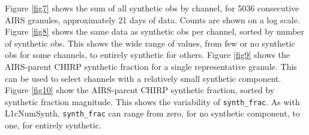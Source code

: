 \documentclass[12pt]{article}
\begin{document}
Figure \ref{fig7} shows the sum of all synthetic obs by channel,
for 5036 consecutive AIRS granules, approximately 21 days of data.
Counts are shown on a log scale.  Figure \ref{fig8} shows the same
data as synthetic obs per channel, sorted by number of synthetic
obs. This shows the wide range of values, from few or no synthetic
obs for some channels, to entirely synthetic for others.  Figure
\ref{fig9} shows the AIRS-parent CHIRP synthetic fraction for a
single representative granule. This can be used to select channels
with a relatively small synthetic component.  Figure \ref{fig10}
show the AIRS-parent CHIRP synthetic fraction, sorted by synthetic
fraction magnitude.  This shows the variability of
\texttt{synth\_frac}.  As with L1cNumSynth, \texttt{synth\_frac} can
range from zero, for no synthetic component, to one, for entirely
synthetic.
\end{document}
